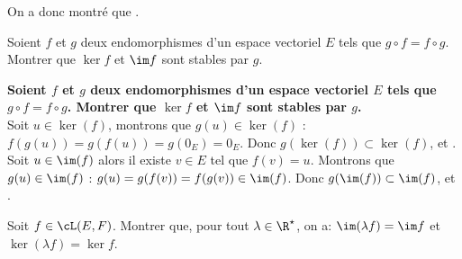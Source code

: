 \documentclass[a4paper, 11pt,reqno]{article}
\begin{document}
\begin{correction}
\begin{enumerate}
\begin{itemize}
\begin{itemize}
			            \end{itemize}
		      \end{itemize}
		      On a donc montr\'e que .
	\end{enumerate}
\end{correction}
\begin{exercice}  \;
	Soient $f$ et $g$ deux endomorphismes d'un espace vectoriel $E$ tels que $g\circ f=f\circ g$. Montrer que $\ker f$ et $\im f$ sont stables par $g$.
\end{exercice}
\begin{correction}  \;
	\textbf{Soient $f$ et $g$ deux endomorphismes d'un espace vectoriel $E$ tels que $g\circ f=f\circ g$. Montrer que $\ker f$ et $\im f$ sont stables par $g$.}\\
	Soit $u \in \ker(f)$, montrons que $g(u) \in \ker(f)$ : $f(g(u))=g(f(u))=g(0_E)=0_E$. Donc $g(\ker(f)) \subset \ker(f)$, et .\\
	Soit $u \in \im(f)$ alors il existe $v\in E$ tel que $f(v)=u$. Montrons que $g(u) \in \im (f)$ : $g(u)=g(f(v)) = f(g(v)) \in \im (f)$. Donc $g(\im (f)) \subset \im (f)$, et .
\end{correction}
\begin{exercice}  \;
	Soit $f\in\cL(E,F)$. Montrer que, pour tout $\lambda\in\R^{\star}$, on a: $\im (\lambda f)=\im f$ et $\ker (\lambda f)=\ker f$.
\end{exercice}
\end{document}
